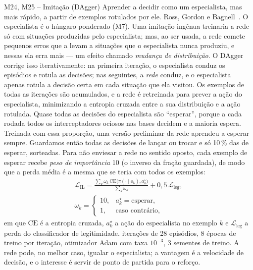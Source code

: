 \begin{metodo}{M24, M25 -- Imitação (DAgger)}
\ideia Aprender a decidir como um especialista, mas mais rápido, a partir de exemplos rotulados por ele.
\orig Ross, Gordon e Bagnell~\cite{ross2011}.
\func O especialista é o húngaro ponderado (M7). Uma imitação ingênua treinaria a rede só com situações produzidas pelo
especialista; mas, ao ser usada, a rede comete pequenos erros que a levam a situações que o especialista nunca produziu, e
nessas ela erra mais --- um efeito chamado \emph{mudança de distribuição}. O DAgger corrige isso iterativamente: na primeira
iteração, o especialista conduz os episódios e rotula as decisões; nas seguintes, a \emph{rede} conduz, e o especialista
apenas rotula a decisão certa em cada situação que ela visitou. Os exemplos de todas as iterações são acumulados, e a rede
é retreinada para prever a ação do especialista, minimizando a entropia cruzada entre a sua distribuição e a ação rotulada.
\adap Quase todas as decisões do especialista são ``esperar'', porque a cada rodada todos os interceptadores ociosos nas
bases decidem e a maioria espera. Treinada com essa proporção, uma versão preliminar da rede aprendeu a esperar sempre.
Guardamos então todas as decisões de lançar ou trocar e só 10\,\% das de esperar, sorteadas. Para não enviesar a rede no
sentido oposto, cada exemplo de esperar recebe \emph{peso de importância} 10 (o inverso da fração guardada), de modo que a
perda média é a mesma que se teria com todos os exemplos:
\begin{equation}
  \begin{gathered}
  \mathcal{L}_{\mathrm{IL}}=\frac{\sum_k\omega_k\,\mathrm{CE}\big(\pi(\cdot\mid o_k),a^\star_k\big)}{\sum_k\omega_k}
  +0{,}5\,\mathcal{L}_{\mathrm{leg}},\\
  \omega_k=\begin{cases}10,&a^\star_k=\text{esperar},\\1,&\text{caso contrário,}\end{cases}
  \end{gathered}
\end{equation}
em que $\mathrm{CE}$ é a entropia cruzada, $a^\star_k$ a ação do especialista no exemplo $k$ e $\mathcal{L}_{\mathrm{leg}}$ a
perda do classificador de legitimidade.
 iterações de 28 episódios, 8 épocas de treino por iteração, otimizador Adam com taxa $10^{-3}$, 3 sementes de
treino.
\espera A rede pode, no melhor caso, igualar o especialista; a vantagem é a velocidade de decisão, e o interesse é servir
de ponto de partida para o reforço.
\end{metodo}

